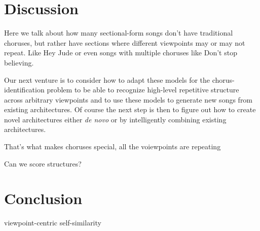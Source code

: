 \documentclass[letterpaper]{article}
\begin{document}
\section{Discussion}

Here we talk about how many sectional-form songs don't have traditional choruses, but rather have sections where different viewpoints may or may not repeat. Like Hey Jude or even songs with multiple choruses like Don't stop believing.

Our next venture is to consider how to adapt these models for the chorus-identification problem to be able to recognize high-level repetitive structure across arbitrary viewpoints and to use these models to generate new songs from existing architectures. Of course the next step is then to figure out how to create novel architectures either \emph{de novo} or by intelligently combining existing architectures.

That's what makes choruses special, all the voiewpoints are repeating

Can we score structures?

\section{Conclusion}
viewpoint-centric self-similarity




\end{document}
